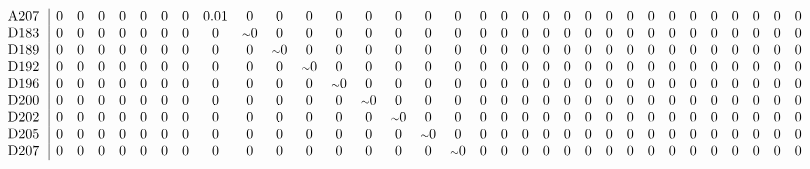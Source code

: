 \begin{table}[H]
\begin{center}
\begin{math}
\begin{array}{c|cccccccccccccccccccccccccccccccc}
\mathrm{A207} \hspace*{2pt} &  0 &  0 &  0 &  0 &  0 &  0 &  0 &       0.01 &  0 &  0 &  0 &  0 &  0 &  0 &  0 &  0 &  0 &  0 &  0 &  0 &  0 &  0 &  0 &  0 &  0 &  0 &  0 &  0 &  0 &  0 &  0 &  0 \\
\mathrm{D183} \hspace*{2pt} &  0 &  0 &  0 &  0 &  0 &  0 &  0 &  0 &  {\scriptstyle \sim }0 &  0 &  0 &  0 &  0 &  0 &  0 &  0 &  0 &  0 &  0 &  0 &  0 &  0 &  0 &  0 &  0 &  0 &  0 &  0 &  0 &  0 &  0 &  0 \\
\mathrm{D189} \hspace*{2pt} &  0 &  0 &  0 &  0 &  0 &  0 &  0 &  0 &  0 &  {\scriptstyle \sim }0 &  0 &  0 &  0 &  0 &  0 &  0 &  0 &  0 &  0 &  0 &  0 &  0 &  0 &  0 &  0 &  0 &  0 &  0 &  0 &  0 &  0 &  0 \\
\mathrm{D192} \hspace*{2pt} &  0 &  0 &  0 &  0 &  0 &  0 &  0 &  0 &  0 &  0 &  {\scriptstyle \sim }0 &  0 &  0 &  0 &  0 &  0 &  0 &  0 &  0 &  0 &  0 &  0 &  0 &  0 &  0 &  0 &  0 &  0 &  0 &  0 &  0 &  0 \\
\mathrm{D196} \hspace*{2pt} &  0 &  0 &  0 &  0 &  0 &  0 &  0 &  0 &  0 &  0 &  0 &  {\scriptstyle \sim }0 &  0 &  0 &  0 &  0 &  0 &  0 &  0 &  0 &  0 &  0 &  0 &  0 &  0 &  0 &  0 &  0 &  0 &  0 &  0 &  0 \\
\mathrm{D200} \hspace*{2pt} &  0 &  0 &  0 &  0 &  0 &  0 &  0 &  0 &  0 &  0 &  0 &  0 &  {\scriptstyle \sim }0 &  0 &  0 &  0 &  0 &  0 &  0 &  0 &  0 &  0 &  0 &  0 &  0 &  0 &  0 &  0 &  0 &  0 &  0 &  0 \\
\mathrm{D202} \hspace*{2pt} &  0 &  0 &  0 &  0 &  0 &  0 &  0 &  0 &  0 &  0 &  0 &  0 &  0 &  {\scriptstyle \sim }0 &  0 &  0 &  0 &  0 &  0 &  0 &  0 &  0 &  0 &  0 &  0 &  0 &  0 &  0 &  0 &  0 &  0 &  0 \\
\mathrm{D205} \hspace*{2pt} &  0 &  0 &  0 &  0 &  0 &  0 &  0 &  0 &  0 &  0 &  0 &  0 &  0 &  0 &  {\scriptstyle \sim }0 &  0 &  0 &  0 &  0 &  0 &  0 &  0 &  0 &  0 &  0 &  0 &  0 &  0 &  0 &  0 &  0 &  0 \\
\mathrm{D207} \hspace*{2pt} &  0 &  0 &  0 &  0 &  0 &  0 &  0 &  0 &  0 &  0 &  0 &  0 &  0 &  0 &  0 &  {\scriptstyle \sim }0 &  0 &  0 &  0 &  0 &  0 &  0 &  0 &  0 &  0 &  0 &  0 &  0 &  0 &  0 &  0 &  0 \\

\end{array}
\end{math}
\end{center}
\end{table}
